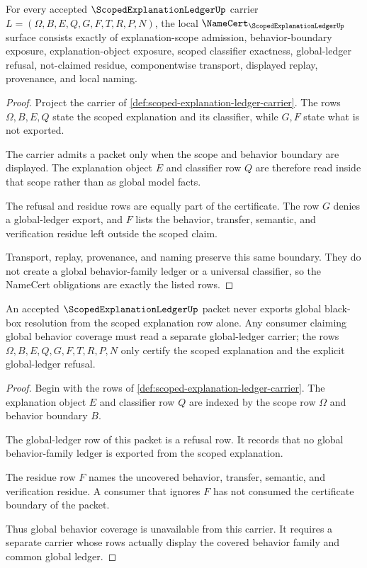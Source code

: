 \begin{theorem}
\label{thm:scoped-explanation-ledger-namecert-obligations}
For every accepted $\ScopedExplanationLedgerUp$ carrier $L=(\Omega,B,E,Q,G,F,T,R,P,N)$, the local $\NameCert_{\ScopedExplanationLedgerUp}$ surface consists exactly of explanation-scope admission, behavior-boundary exposure, explanation-object exposure, scoped classifier exactness, global-ledger refusal, not-claimed residue, componentwise transport, displayed replay, provenance, and local naming.
\end{theorem}
\begin{proof}
Project the carrier of \autoref{def:scoped-explanation-ledger-carrier}. The rows $\Omega,B,E,Q$ state the scoped explanation and its classifier, while $G,F$ state what is not exported.

The carrier admits a packet only when the scope and behavior boundary are displayed. The explanation object $E$ and classifier row $Q$ are therefore read inside that scope rather than as global model facts.

The refusal and residue rows are equally part of the certificate. The row $G$ denies a global-ledger export, and $F$ lists the behavior, transfer, semantic, and verification residue left outside the scoped claim.

Transport, replay, provenance, and naming preserve this same boundary. They do not create a global behavior-family ledger or a universal classifier, so the NameCert obligations are exactly the listed rows.
\end{proof}

\begin{theorem}
\label{thm:scoped-explanation-ledger-global-nonescape}
An accepted $\ScopedExplanationLedgerUp$ packet never exports global black-box resolution from the scoped explanation row alone. Any consumer claiming global behavior coverage must read a separate global-ledger carrier; the rows $\Omega,B,E,Q,G,F,T,R,P,N$ only certify the scoped explanation and the explicit global-ledger refusal.
\end{theorem}
\begin{proof}
Begin with the rows of \autoref{def:scoped-explanation-ledger-carrier}. The explanation object $E$ and classifier row $Q$ are indexed by the scope row $\Omega$ and behavior boundary $B$.

The global-ledger row of this packet is a refusal row. It records that no global behavior-family ledger is exported from the scoped explanation.

The residue row $F$ names the uncovered behavior, transfer, semantic, and verification residue. A consumer that ignores $F$ has not consumed the certificate boundary of the packet.

Thus global behavior coverage is unavailable from this carrier. It requires a separate carrier whose rows actually display the covered behavior family and common global ledger.
\end{proof}


